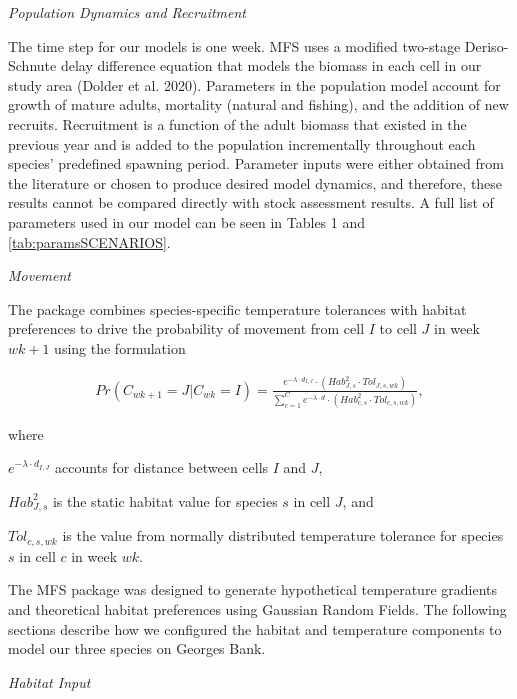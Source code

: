 \documentclass[
  12pt,
]{article}
\begin{document}
\emph{Population Dynamics and Recruitment}

The time step for our models is one week. MFS uses a modified two-stage Deriso-Schnute delay difference equation that models the biomass in each cell in our study area (Dolder et al. 2020). Parameters in the population model account for growth of mature adults, mortality (natural and fishing), and the addition of new recruits. Recruitment is a function of the adult biomass that existed in the previous year and is added to the population incrementally throughout each species' predefined spawning period. Parameter inputs were either obtained from the literature or chosen to produce desired model dynamics, and therefore, these results cannot be compared directly with stock assessment results. A full list of parameters used in our model can be seen in Tables 1 and \ref{tab:paramsSCENARIOS}.

\emph{Movement}

The package combines species-specific temperature tolerances with habitat preferences to drive the probability of movement from cell \(I\) to cell \(J\) in week \(wk+1\) using the formulation

\begin{align}
Pr(C_{wk+1}=J|C_{wk}=I) = \frac{e^{-\lambda \cdot d_{I,J}}\cdot(Hab^2_{J,s} \cdot Tol_{J,s,wk})}{\sum^C_{c=1}e^{-\lambda \cdot d} \cdot (Hab^2_{c,s} \cdot Tol_{c,s,wk})},
\label{moveP}
\end{align}

where

\(e^{-\lambda \cdot d_{I,J}}\) accounts for distance between cells \(I\) and \(J\),

\(Hab^2_{J,s}\) is the static habitat value for species \(s\) in cell \(J\), and

\(Tol_{c,s,wk}\) is the value from normally distributed temperature tolerance for species \(s\) in cell \(c\) in week \(wk\).

The MFS package was designed to generate hypothetical temperature gradients and theoretical habitat preferences using Gaussian Random Fields. The following sections describe how we configured the habitat and temperature components to model our three species on Georges Bank.

\emph{Habitat Input}
\end{document}
